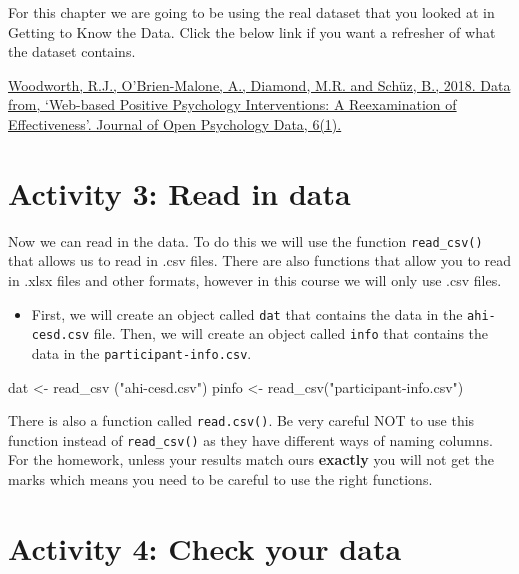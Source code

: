 \documentclass[
  oneside]{book}
\newenvironment{Shaded}{\begin{snugshade}}{\end{snugshade}}
\newcommand{\FunctionTok}[1]{\textcolor[rgb]{0.00,0.00,0.00}{#1}}
\newcommand{\NormalTok}[1]{#1}
\newcommand{\OtherTok}[1]{\textcolor[rgb]{0.56,0.35,0.01}{#1}}
\newcommand{\StringTok}[1]{\textcolor[rgb]{0.31,0.60,0.02}{#1}}
\providecommand{\tightlist}{%
  \setlength{\itemsep}{0pt}\setlength{\parskip}{0pt}}
\begin{document}
For this chapter we are going to be using the real dataset that you looked at in Getting to Know the Data. Click the below link if you want a refresher of what the dataset contains.

\href{https://openpsychologydata.metajnl.com/articles/10.5334/jopd.35/}{Woodworth, R.J., O'Brien-Malone, A., Diamond, M.R. and Schüz, B., 2018. Data from, `Web-based Positive Psychology Interventions: A Reexamination of Effectiveness'. Journal of Open Psychology Data, 6(1).}

\hypertarget{activity-3-read-in-data}{%
\section{Activity 3: Read in data}\label{activity-3-read-in-data}}

Now we can read in the data. To do this we will use the function \texttt{read\_csv()} that allows us to read in .csv files. There are also functions that allow you to read in .xlsx files and other formats, however in this course we will only use .csv files.

\begin{itemize}
\tightlist
\item
  First, we will create an object called \texttt{dat} that contains the data in the \texttt{ahi-cesd.csv} file. Then, we will create an object called \texttt{info} that contains the data in the \texttt{participant-info.csv}.
\end{itemize}

\begin{Shaded}
\begin{Highlighting}[]
\NormalTok{dat }\OtherTok{\textless{}{-}} \FunctionTok{read\_csv}\NormalTok{ (}\StringTok{"ahi{-}cesd.csv"}\NormalTok{)}
\NormalTok{pinfo }\OtherTok{\textless{}{-}} \FunctionTok{read\_csv}\NormalTok{(}\StringTok{"participant{-}info.csv"}\NormalTok{)}
\end{Highlighting}
\end{Shaded}

\begin{danger}
There is also a function called \texttt{read.csv()}. Be very careful NOT
to use this function instead of \texttt{read\_csv()} as they have
different ways of naming columns. For the homework, unless your results
match ours \textbf{exactly} you will not get the marks which means you
need to be careful to use the right functions.
\end{danger}

\hypertarget{activity-4-check-your-data}{%
\section{Activity 4: Check your data}\label{activity-4-check-your-data}}
\end{document}
